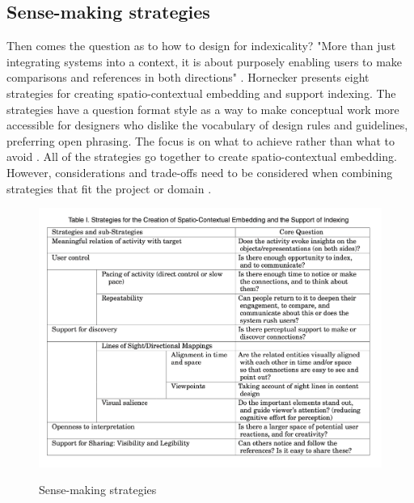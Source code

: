 \subsection{Sense-making strategies}
Then comes the question as to how to design for indexicality? "More than just integrating systems into a context, it is about purposely enabling users to make comparisons and references in both directions" \autocite[p. 34]{hornecker_to-and-fro_2016}. Hornecker presents eight strategies for creating spatio-contextual embedding and support indexing. The strategies have a question format style as a way to make conceptual work more accessible for designers who dislike the vocabulary of design rules and guidelines, preferring open phrasing\autocite[p. 34]{hornecker_to-and-fro_2016}. The focus is on what to achieve rather than what to avoid \autocite[p. 34]{hornecker_to-and-fro_2016}. All of the strategies go together to create spatio-contextual embedding. However, considerations and trade-offs need to be considered when combining strategies that fit the project or domain \autocite[p. 34]{hornecker_to-and-fro_2016}.

\begin{figure}[H]
\centering 
\includegraphics[width=12.5cm]{pictures/strategies.png}
\caption{Sense-making strategies}
\autocite[p. 35]{hornecker_to-and-fro_2016}
\end{figure}